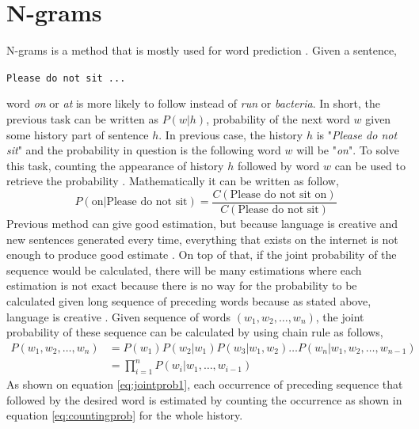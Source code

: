 \section{N-grams}
    N-grams is a method that is mostly used for word prediction
    \citep{speech2009Jurafsky}. Given a sentence,
    \begin{center}
        \texttt{Please do not sit ...}
    \end{center}
    word \textit{on} or \textit{at} is more likely to follow instead
    of \textit{run} or \textit{bacteria}. In short, the previous task
    can be written as $P(w\vert h)$, probability of the next word $w$
    given some history part of sentence $h$. In previous case, the
    history $h$ is "\textit{Please do not sit}" and the probability in
    question is the following word $w$ will be "\textit{on}". To solve
    this task, counting the appearance of history $h$ followed by word
    $w$ can be used to retrieve the probability
    \citep{speech2009Jurafsky}. Mathematically it can
    be written as follow,
    \begin{equation}
        \label{eq:countingprob}
        P(\text{on} \vert \text{Please do not sit}) = 
        \frac{C(\text{Please do not sit on})}{C(\text{Please do not sit})}
    \end{equation}
    Previous method can give good estimation, but because language is
    creative and new sentences generated every time, everything that
    exists on the internet is not enough to produce good estimate
    \citep{speech2009Jurafsky}. On top of that, if
    the joint probability of the sequence would be calculated, there
    will be many estimations where each estimation is not exact
    because there is no way for the probability to be calculated given
    long sequence of preceding words because as stated above,
    language is creative
    \citep{speech2009Jurafsky}. Given sequence of
    words $(w_1, w_2, \dots, w_n)$, the joint probability of these
    sequence can be calculated by using chain rule as follows,
    \begin{align}
        \label{eq:jointprob1}
        P(w_1, w_2, \dots, w_n) &= P(w_1)P(w_2 \vert w_1)P(w_3 \vert w_1, w_2) \dots
        P(w_n \vert w_1, w_2, \dots, w_{n-1}) \\
        \label{eq:jointprob2}
        &= \prod_{i=1}^n P(w_i \vert w_1, \dots, w_{i-1})
    \end{align}
    As shown on equation \ref{eq:jointprob1}, each occurrence of
    preceding sequence that followed by the desired word is estimated
    by counting the occurrence as shown in equation
    \ref{eq:countingprob} for the whole history.
    
